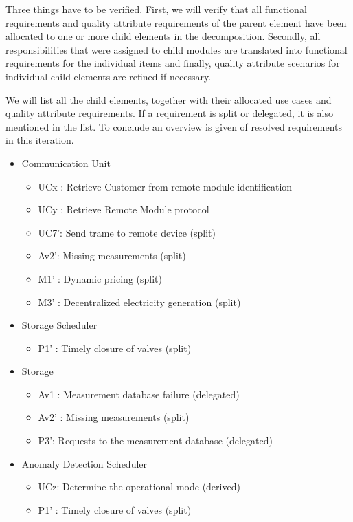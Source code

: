 \npar Three things have to be verified. First, we will verify that all
functional requirements and quality attribute requirements of the parent element
have been allocated to one or more child elements in the decomposition.
Secondly, all responsibilities that were assigned to child modules are
translated into functional requirements for the individual items and finally,
quality attribute scenarios for individual child elements are refined if
necessary.

\npar We will list all the child elements, together with their allocated use
cases and quality attribute requirements. If a requirement is split or
delegated, it is also mentioned in the list. To conclude an overview is given of
resolved requirements in this iteration.

\begin{itemize}
	\item Communication Unit
	\begin{itemize}
	  	\item UCx : Retrieve Customer from remote module identification
	  	\item UCy : Retrieve Remote Module protocol
		\item UC7': Send trame to remote device (split)
		\item Av2': Missing measurements (split)
		\item M1' : Dynamic pricing (split)
		\item M3' : Decentralized electricity generation (split)
	\end{itemize}
	\item Storage Scheduler
	\begin{itemize}
		\item P1' : Timely closure of valves (split)
	\end{itemize}
	\item Storage
	\begin{itemize}
		\item Av1 : Measurement database failure (delegated)
		\item Av2' : Missing measurements (split)
	  	\item P3': Requests to the measurement database (delegated)
	\end{itemize}
	\item Anomaly Detection Scheduler
	\begin{itemize}
		\item UCz: Determine the operational mode (derived)
		\item P1' : Timely closure of valves (split)

\end{itemize}
\end{itemize}
